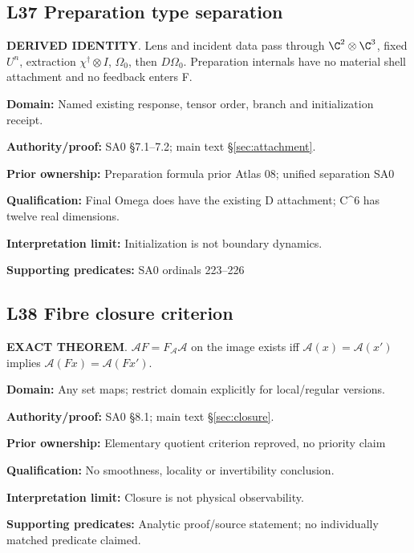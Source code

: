\par\noindent\begin{minipage}{\linewidth}
\subsection*{L37 Preparation type separation}
\textbf{DERIVED IDENTITY}. Lens and incident data pass through \(\C^2\otimes\C^3\), fixed \(U^n\), extraction \(\chi^\dagger\otimes I\), \(\Omega_0\), then \(D\Omega_0\). Preparation internals have no material shell attachment and no feedback enters F.\par
\textbf{Domain:} Named existing response, tensor order, branch and initialization receipt.\par
\textbf{Authority/proof:} SA0 \S{}7.1--7.2; main text \S\ref{sec:attachment}.\par
\textbf{Prior ownership:} Preparation formula prior Atlas 08; unified separation SA0\par
\textbf{Qualification:} Final Omega does have the existing D attachment; C\textasciicircum{}6 has twelve real dimensions.\par
\textbf{Interpretation limit:} Initialization is not boundary dynamics.\par
\textbf{Supporting predicates:} SA0 ordinals 223--226\par
\end{minipage}\par\medskip
\par\noindent\begin{minipage}{\linewidth}
\subsection*{L38 Fibre closure criterion}
\textbf{EXACT THEOREM}. \(\mathcal AF=F_{\mathcal A}\mathcal A\) on the image exists iff \(\mathcal A(x)=\mathcal A(x')\) implies \(\mathcal A(Fx)=\mathcal A(Fx')\).\par
\textbf{Domain:} Any set maps; restrict domain explicitly for local/regular versions.\par
\textbf{Authority/proof:} SA0 \S{}8.1; main text \S\ref{sec:closure}.\par
\textbf{Prior ownership:} Elementary quotient criterion reproved, no priority claim\par
\textbf{Qualification:} No smoothness, locality or invertibility conclusion.\par
\textbf{Interpretation limit:} Closure is not physical observability.\par
\textbf{Supporting predicates:} Analytic proof/source statement; no individually matched predicate claimed.\par
\end{minipage}\par\medskip

